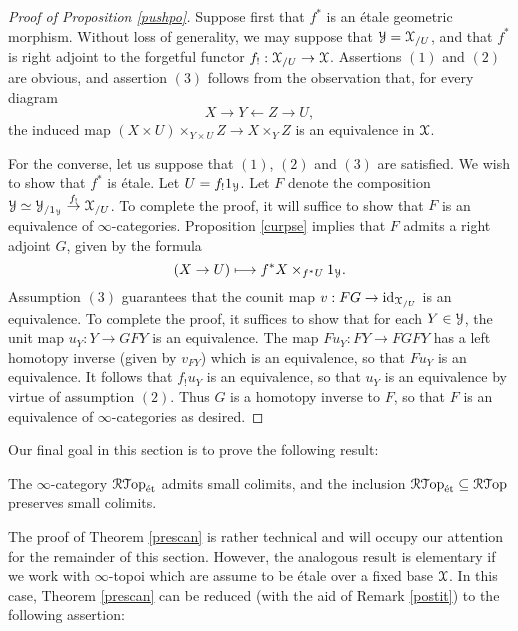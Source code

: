 \begin{proof}[Proof of Proposition \ref{pushpo}]
Suppose first that $f^{\ast}$ is an \'{e}tale geometric morphism. Without loss of generality, we may suppose that $\operatorname{\mathcal{Y}} = \operatorname{\mathcal{X}}_{/U}$, and that $f^{\ast}$ is right adjoint to the forgetful functor
$f_{!}: \operatorname{\mathcal{X}}_{/U} \rightarrow \operatorname{\mathcal{X}}$. Assertions $(1)$ and $(2)$ are obvious, and assertion
$(3)$ follows from the observation that, for every diagram
$$ X \rightarrow Y \leftarrow Z \rightarrow U,$$
the induced map $(X \times U) \times_{ Y \times U } Z \rightarrow X \times_{Y} Z$
is an equivalence in $\operatorname{\mathcal{X}}$.

For the converse, let us suppose that $(1)$, $(2)$ and $(3)$ are satisfied. We wish to show that
$f^{\ast}$ is \'{e}tale. Let $U = f_{!} 1_{\operatorname{\mathcal{Y}}}$. Let 
$F$ denote the composition $\operatorname{\mathcal{Y}} \simeq \operatorname{\mathcal{Y}}_{/1_{\operatorname{\mathcal{Y}}}} \stackrel{f_{!}}{\rightarrow} \operatorname{\mathcal{X}}_{/U}$. 
To complete the proof, it will suffice to show that $F$ is an equivalence of $\infty$-categories. Proposition \ref{curpse} implies that $F$ admits a right adjoint $G$, given by the formula
$$(X \rightarrow U) \longmapsto f^{\ast} X \times_{ f^{\ast} U} 1_{\operatorname{\mathcal{Y}}}.$$
Assumption $(3)$ guarantees that the counit map $v: FG \rightarrow \operatorname{id}_{\operatorname{\mathcal{X}}_{/U}}$ is
an equivalence. To complete the proof, it suffices to show that for each $Y \in \operatorname{\mathcal{Y}}$, the
unit map $u_Y: Y \rightarrow GFY$ is an equivalence. The map $Fu_Y: FY \rightarrow FGFY$
has a left homotopy inverse (given by $v_{FY}$) which is an equivalence, so that $F u_{Y}$ is
an equivalence. It follows that $f_{!} u_Y$ is an equivalence, so that $u_Y$ is an equivalence
by virtue of assumption $(2)$. Thus $G$ is a homotopy inverse to $F$, so that $F$ is an equivalence of $\infty$-categories as desired.
\end{proof}

Our final goal in this section is to prove the following result:

\begin{theorem}\label{prescan}
The $\infty$-category $\operatorname{\mathcal{R}{\mathcal T}op}_{\text{\'{e}t}}$ admits small colimits, and the inclusion
$\operatorname{\mathcal{R}{\mathcal T}op}_{\text{\'{e}t}} \subseteq \operatorname{\mathcal{R}{\mathcal T}op}$ preserves small colimits.
\end{theorem}

The proof of Theorem \ref{prescan} is rather technical and will occupy our attention for the remainder of this section. However, the analogous result
is elementary if we work with $\infty$-topoi which are assume to be \'{e}tale over a fixed
base $\operatorname{\mathcal{X}}$. In this case, Theorem \ref{prescan} can be reduced (with the aid of Remark \ref{postit}) to the following assertion:

